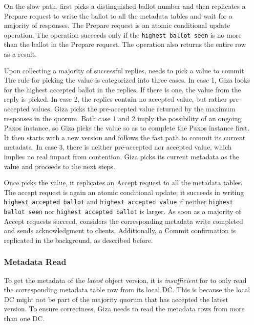 On the slow path, {\name} first picks a distinguished ballot number and
then replicates a Prepare request to write the ballot to all the metadata tables
and wait for a majority of responses. The Prepare request is an atomic conditional
update operation. The operation succeeds only if the {\tt highest ballot seen}
is no more than the ballot in the Prepare request. The operation also returns
the entire row as a result.

Upon collecting a majority of successful replies, {\name} needs to pick
a value to commit. The rule for picking the value is categorized into three
cases. In case 1, Giza looks for the highest accepted ballot in the replies. If
there is one, the value from the reply is picked. In case 2, the replies contain
no accepted value, but rather pre-accepted values. Giza picks the pre-accepted
value returned by the maximum responses in the quorum. Both case 1 and 2
imply the possibility of an ongoing Paxos instance, so Giza picks the value so
as to complete the Paxos instance first. It then starts with a new version and
follows the fast path to commit its current metadata. In case 3, there is
neither pre-accepted nor accepted value, which implies no real impact from
contention. Giza picks its current metadata as the value and proceeds to the next
steps.

Once {\name} picks the value, it replicates an Accept request to all the
metadata tables. The accept request is again an atomic conditional update; it
succeeds in writing {\tt highest accepted ballot} and {\tt highest accepted
  value} if neither {\tt highest ballot seen} nor {\tt highest accepted ballot}
is larger. 
As soon as a majority of Accept requests succeed, \name considers
the corresponding metadata write completed and sends acknowledgment to clients. 
Additionally, a Commit confirmation is replicated in the background, as
described before.

\subsubsection{Metadata Read}

To get the metadata of the \emph{latest} object version, it is {\em insufficient} for
\name to only read the corresponding metadata table row from its local DC. This
is because the local DC might not be part of the majority quorum that has
accepted the latest version. To ensure correctness, Giza needs to read the
metadata rows from more than one DC.

